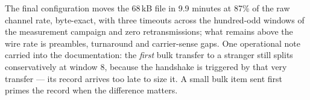 The final configuration moves the 68\,kB file in 9.9 minutes at
87\% of the raw channel rate, byte-exact, with three timeouts across
the hundred-odd windows of the measurement campaign and zero
retransmissions; what remains above the wire rate is preambles,
turnaround and carrier-sense gaps. One operational note carried into
the documentation: the \emph{first} bulk transfer to a stranger still
splits conservatively at window 8, because the handshake is triggered
by that very transfer --- its record arrives too late to size it. A
small bulk item sent first primes the record when the difference
matters.
